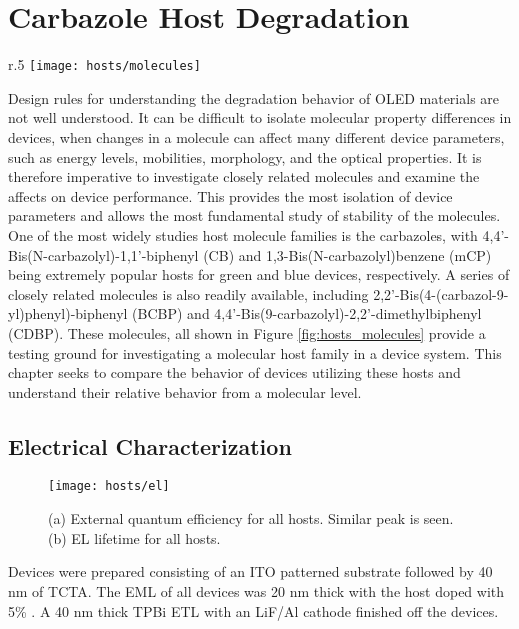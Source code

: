 \documentclass[../thesis.tex]{subfiles}
\begin{document}
\chapter{Carbazole Host Degradation}\label{sec:hosts}

\begin{wrapfigure}{r}{.5\textwidth}
\centering
\texttt{[image: hosts/molecules]}
\caption{Host molecules used in this study.}
\label{fig:hosts_molecules}
\end{wrapfigure}

Design rules for understanding the degradation behavior of OLED materials are not well understood.
It can be difficult to isolate molecular property differences in devices, when changes in a molecule can affect many different device parameters, such as energy levels, mobilities, morphology, and the optical properties.
It is therefore imperative to investigate closely related molecules and examine the affects on device performance.
This provides the most isolation of device parameters and allows the most fundamental study of stability of the molecules.
One of the most widely studies host molecule families is the carbazoles, with 4,4'-Bis(N-carbazolyl)-1,1'-biphenyl (CB) and 1,3-Bis(N-carbazolyl)benzene (mCP) being extremely popular hosts for green and blue devices, respectively.
A series of closely related molecules is also readily available, including 2,2'-Bis(4-(carbazol-9-yl)phenyl)-biphenyl (BCBP) and 4,4'-Bis(9-carbazolyl)-2,2'-dimethylbiphenyl (CDBP).
These molecules, all shown in Figure \ref{fig:hosts_molecules} provide a testing ground for investigating a molecular host family in a device system.
This chapter seeks to compare the behavior of devices utilizing these hosts and understand their relative behavior from a molecular level.


\section{Electrical Characterization}

\begin{figure}[ht]
\centering
\texttt{[image: hosts/el]}
\caption{(a) External quantum efficiency \eqe for all hosts.  Similar peak \eqe is seen. (b) EL lifetime for all hosts.}
\label{fig:hosts_el}
\end{figure}

Devices were prepared consisting of an ITO patterned substrate followed by 40 nm of TCTA.
The EML of all devices was 20 nm thick with the host doped with 5\% \irppy.
A 40 nm thick TPBi ETL with an LiF/Al cathode finished off the devices.
\end{document}
